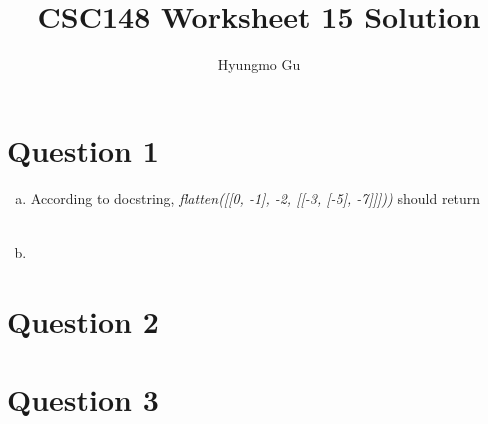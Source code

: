 \documentclass[12pt]{article}
\begin{document}
\title{CSC148 Worksheet 15 Solution}
\author{Hyungmo Gu}
\maketitle

\section*{Question 1}
\begin{enumerate}[a.]
    \item

    According to docstring, \textit{flatten([[0, -1], -2, [[-3, [-5], -7]]]))}
    should return

    \begin{align*}
        [0,-1,-2,-3,-5,-7]
    \end{align*}

    \item
\end{enumerate}

\section*{Question 2}

\section*{Question 3}
\end{document}
